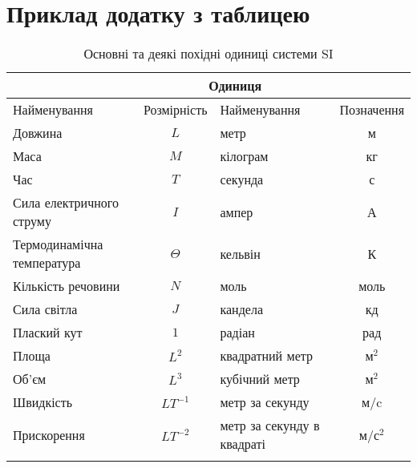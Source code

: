 \chapter[(Довідковий) Приклад додатку з таблицею]{Приклад додатку з таблицею}\label{apdx:SI}

\begin{table}[h]
\underonespace
	\caption{\label{apdx:table}Основні та деякі похідні одиниці системи SI}
	\begin{tabular}{|>{\raggedright}m{5cm}|c|m{4cm}|c|}
\hline
\multicolumn{2}{|c|}{Величина}&\multicolumn{2}{c|}{Одиниця}\\[0pt]\hline\vspace{4pt}
Найменування & Розмірність & Найменування & Позначення \\[0pt]\hline\hline\vspace{4pt}
Довжина & $L$ & метр & м \\[0pt]\hline\vspace{4pt}
Маса & $M$ & кілограм & кг \\[0pt]\hline\vspace{4pt}
Час & $T$ & секунда & с \\[0pt]\hline\vspace{4pt}
Сила електричного струму & $I$ & ампер & А \\[0pt]\hline\vspace{4pt}
Термодинамічна температура & $\Theta$ & кельвін & К \\[0pt]\hline\vspace{4pt}
Кількість речовини & $N$ & моль & моль \\[0pt]\hline\vspace{4pt}
Сила світла & $J$ & кандела & кд \\[0pt]\hline
\hline\vspace{4pt}
Плаский кут & $1$ & радіан & рад \\[0pt]\hline\vspace{4pt}
Площа & $L^2$ & квадратний метр & м$^2$ \\[0pt]\hline\vspace{4pt}
Об'єм & $L^3$ & кубічний метр & м$^2$\\[0pt]\hline\vspace{4pt}
Швидкість & $LT^{-1}$ & метр за секунду & м/c \\[0pt]\hline\vspace{4pt}
Прискорення & $LT^{-2}$ & метр за секунду в квадраті & м/с$^2$\\[0pt]\hline\vspace{4pt}

\end{tabular}
\end{table}
